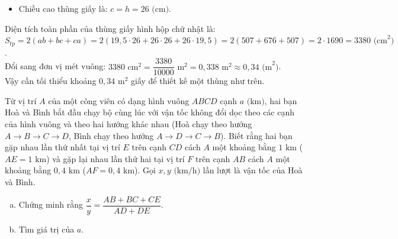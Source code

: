 \begin{bt}
{\begin{enumerate}[a)]
\begin{itemize}
		\item Chiều cao thùng giấy là: $c = h = 26\text{ (cm)}$.
	\end{itemize}
	Diện tích toàn phần của thùng giấy hình hộp chữ nhật là:
	$S_{tp} = 2(ab + bc + ca) = 2(19{,}5\cdot 26 + 26\cdot 26 + 26\cdot 19{,}5) = 2(507 + 676 + 507) = 2\cdot 1690 = 3380\text{ (cm}^2\text{)}$.\\
	Đổi sang đơn vị mét vuông:
	$3380\text{ cm}^2 = \dfrac{3380}{10000}\text{ m}^2 = 0{,}338\text{ m}^2 \approx 0{,}34\text{ (m}^2\text{)}$.\\
	Vậy cần tối thiểu khoảng $0{,}34\text{ m}^2$ giấy để thiết kế một thùng như trên.
\end{enumerate}
}
\end{bt}

\begin{bt}%
Từ vị trí $A$ của một công viên có dạng hình vuông $ABCD$ cạnh $a\text{ (km)}$, hai bạn Hoà và Bình bắt đầu chạy bộ cùng lúc với vận tốc không đổi dọc theo các cạnh của hình vuông và theo hai hướng khác nhau (Hoà chạy theo hướng $A \to B \to C \to D$, Bình chạy theo hướng $A \to D \to C \to B$). Biết rằng hai bạn gặp nhau lần thứ nhất tại vị trí $E$ trên cạnh $CD$ cách $A$ một khoảng bằng $1\text{ km}$ ($AE = 1\text{ km}$) và gặp lại nhau lần thứ hai tại vị trí $F$ trên cạnh $AB$ cách $A$ một khoảng bằng $0{,}4\text{ km}$ ($AF = 0{,}4\text{ km}$). Gọi $x, y\text{ (km/h)}$ lần lượt là vận tốc của Hoà và Bình.
\begin{enumerate}[a)]
	\item Chứng minh rằng $\dfrac{x}{y} = \dfrac{AB + BC + CE}{AD + DE}$.
	\item Tìm giá trị của $a$.
\end{enumerate}
\end{bt}
